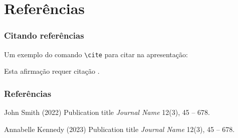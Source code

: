 
\section{Referências}

\begin{frame}
	\frametitle{Citando referências}
	
	Um exemplo do comando \texttt{\textbackslash cite} para citar na apresentação:
	
	\bigskip %
	
	Esta afirmação requer citação \cite{p1,p2}.
\end{frame}

\begin{frame} %
	\frametitle{Referências}
	
	\begin{thebibliography}{99} %
		\footnotesize %
		
			John Smith (2022)
			\newblock Publication title
			\newblock \emph{Journal Name} 12(3), 45 -- 678.
			
			Annabelle Kennedy (2023)
			\newblock Publication title
			\newblock \emph{Journal Name} 12(3), 45 -- 678.
	\end{thebibliography}
\end{frame}
